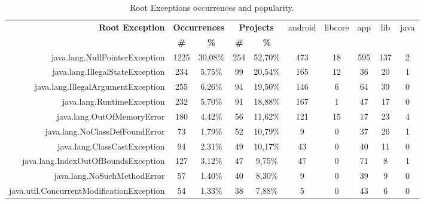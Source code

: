 \documentclass[conference]{IEEEtran}
\begin{document}
\begin{table}
  \centering
  \begin{tabular}{rccccccccc}
    \hline
    \bfseries{Root Exception} &  \multicolumn{2}{c}{\bfseries{Occurrences}} &  \multicolumn{2}{c}{\bfseries{Projects}} & \textsf{android} & \textsf{libcore} & \textsf{app} & \textsf{lib} & \textsf{java} \\
    & \bfseries{\#} &  \bfseries{\%} & \bfseries{\# } & \bfseries{\% } &&&&&\\
    \hline
java.lang.NullPointerException            & 1225 & 30,08\% & 254 & 52,70\% & 473 & 18 & 595 & 137 & 2 \\
java.lang.IllegalStateException           & 234  & 5,75\%  & 99  & 20,54\% & 165 & 12 & 36  & 20  & 1 \\
java.lang.IllegalArgumentException        & 255  & 6,26\%  & 94  & 19,50\% & 146 & 6  & 64  & 39  & 0 \\
java.lang.RuntimeException                & 232  & 5,70\%  & 91  & 18,88\% & 167 & 1  & 47  & 17  & 0 \\
java.lang.OutOfMemoryError                & 180  & 4,42\%  & 56  & 11,62\% & 121 & 15 & 17  & 23  & 4 \\
java.lang.NoClassDefFoundError            & 73   & 1,79\%  & 52  & 10,79\% & 9   & 0  & 37  & 26  & 1 \\
java.lang.ClassCastException              & 94   & 2,31\%  & 49  & 10,17\% & 43  & 0  & 40  & 11  & 0 \\
java.lang.IndexOutOfBoundsException       & 127  & 3,12\%  & 47  & 9,75\%  & 47  & 0  & 71  & 8   & 1 \\
java.lang.NoSuchMethodError               & 57   & 1,40\%  & 40  & 8,30\%  & 9   & 0  & 39  & 9   & 0 \\
java.util.ConcurrentModificationException & 54   & 1,33\%  & 38  & 7,88\%  & 5   & 0  & 43  & 6   & 0 \\

    \hline
  \end{tabular}
\caption{Root Exceptions occurrences and popularity.}
\label{tab:toptenandroid}
\end{table}

\end{document}

